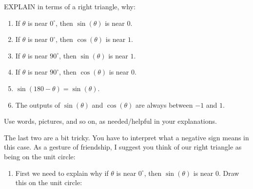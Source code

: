 \documentclass[noauthor,nooutcomes,12pt]{ximera}
\begin{document}
\begin{question}
  EXPLAIN in terms of a right triangle, why:
  \begin{enumerate}
  \item If $\theta$ is near $0^\circ$, then $\sin(\theta)$ is near $0$.
  \item If $\theta$ is near $0^\circ$, then $\cos(\theta)$ is near $1$.
  \item If $\theta$ is near $90^\circ$, then $\sin(\theta)$ is near $1$.
  \item If $\theta$ is near $90^\circ$, then $\cos(\theta)$ is near $0$.
  \item $\sin(180-\theta) = \sin(\theta)$.
  \item The outputs of $\sin(\theta)$ and $\cos(\theta)$ are always
    between $-1$ and $1$.
  \end{enumerate}
  Use words, pictures, and so on, as needed/helpful in your
  explanations.
  \begin{hint}
    The last two are a bit tricky. You have to interpret what a
    negative sign means in this case. As a gesture of friendship, I
    suggest you think of our right triangle as being on the unit circle:
    \begin{center}
    \end{center}
  \end{hint}
  \begin{freeResponse}
    \begin{enumerate}
    \item First we need to explain why if $\theta$ is near $0^\circ$,
      then $\sin(\theta)$ is near $0$.  Draw this on the unit circle:
      \begin{center}
\end{center}
\end{enumerate}
\end{freeResponse}
\end{question}
\end{document}
